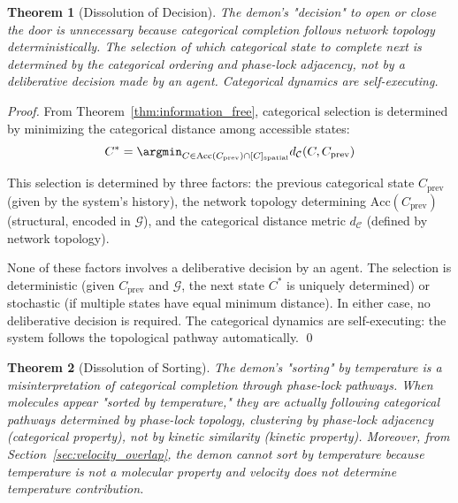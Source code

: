 \documentclass[12pt,a4paper]{article}
\newtheorem{theorem}{Theorem}[section]
\theoremstyle{definition}
\theoremstyle{remark}
\newcommand{\phaselockgraph}{\mathcal{G}}
\newcommand{\catspace}{\mathcal{C}}
\newcommand{\accessible}{\text{Acc}}
\begin{document}
\begin{theorem}[Dissolution of Decision]
\label{thm:dissolution_decision}
The demon's "decision" to open or close the door is unnecessary because categorical completion follows network topology deterministically. The selection of which categorical state to complete next is determined by the categorical ordering and phase-lock adjacency, not by a deliberative decision made by an agent. Categorical dynamics are self-executing.
\end{theorem}

\begin{proof}
From Theorem~\ref{thm:information_free}, categorical selection is determined by minimizing the categorical distance among accessible states:
\begin{equation}
C^* = \argmin_{C \in \accessible(C_{\text{prev}}) \cap [C]_{\text{spatial}}} d_{\catspace}(C, C_{\text{prev}})
\end{equation}

This selection is determined by three factors: the previous categorical state $C_{\text{prev}}$ (given by the system's history), the network topology determining $\accessible(C_{\text{prev}})$ (structural, encoded in $\phaselockgraph$), and the categorical distance metric $d_{\catspace}$ (defined by network topology).

None of these factors involves a deliberative decision by an agent. The selection is deterministic (given $C_{\text{prev}}$ and $\phaselockgraph$, the next state $C^*$ is uniquely determined) or stochastic (if multiple states have equal minimum distance). In either case, no deliberative decision is required. The categorical dynamics are self-executing: the system follows the topological pathway automatically. \qed
\end{proof}

\begin{theorem}[Dissolution of Sorting]
\label{thm:dissolution_sorting}
The demon's "sorting" by temperature is a misinterpretation of categorical completion through phase-lock pathways. When molecules appear "sorted by temperature," they are actually following categorical pathways determined by phase-lock topology, clustering by phase-lock adjacency (categorical property), not by kinetic similarity (kinetic property). Moreover, from Section~\ref{sec:velocity_overlap}, the demon cannot sort by temperature because temperature is not a molecular property and velocity does not determine temperature contribution.
\end{theorem}
\end{document}
